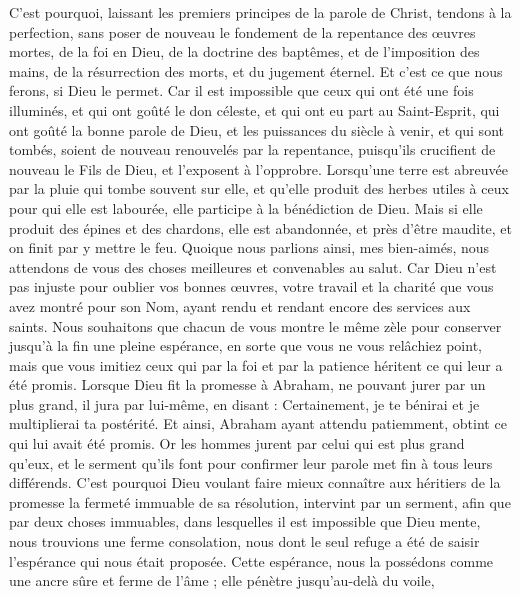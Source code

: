 \begin{multicols}{2}
\VerseOne{}C'est pourquoi, laissant les premiers principes de la parole de Christ, tendons à la perfection, sans poser de nouveau le fondement de la repentance des œuvres mortes,
de la foi en Dieu, de la doctrine des baptêmes, et de l'imposition des mains, de la résurrection des morts, et du jugement éternel.
Et c'est ce que nous ferons, si Dieu le permet.
Car il est impossible que ceux qui ont été une fois illuminés, et qui ont goûté le don céleste, et qui ont eu part au Saint-Esprit,
qui ont goûté la bonne parole de Dieu, et les puissances du siècle à venir,
et qui sont tombés, soient de nouveau renouvelés par la repentance, puisqu’ils crucifient de nouveau le Fils de Dieu, et l'exposent à l'opprobre.
Lorsqu’une terre est abreuvée par la pluie qui tombe souvent sur elle, et qu’elle produit des herbes utiles à ceux pour qui elle est labourée, elle participe à la bénédiction de Dieu.
Mais si elle produit des épines et des chardons, elle est abandonnée, et près d’être maudite, et on finit par y mettre le feu.
Quoique nous parlions ainsi, mes bien-aimés, nous attendons de vous des choses meilleures et convenables au salut.
Car Dieu n'est pas injuste pour oublier vos bonnes œuvres, votre travail et la charité que vous avez montré pour son Nom, ayant rendu et rendant encore des services aux saints.
Nous souhaitons que chacun de vous montre le même zèle pour conserver jusqu'à la fin une pleine espérance,
en sorte que vous ne vous relâchiez point, mais que vous imitiez ceux qui par la foi et par la patience héritent ce qui leur a été promis.
Lorsque Dieu fit la promesse à Abraham, ne pouvant jurer par un plus grand, il jura par lui-même,
en disant : Certainement, je te bénirai et je multiplierai ta postérité.
Et ainsi, Abraham ayant attendu patiemment, obtint ce qui lui avait été promis.
Or les hommes jurent par celui qui est plus grand qu'eux, et le serment qu'ils font pour confirmer leur parole met fin à tous leurs différends.
C'est pourquoi Dieu voulant faire mieux connaître aux héritiers de la promesse la fermeté immuable de sa résolution, intervint par un serment,
afin que par deux choses immuables, dans lesquelles il est impossible que Dieu mente, nous trouvions une ferme consolation, nous dont le seul refuge a été de saisir l'espérance qui nous était proposée.
Cette espérance, nous la possédons comme une ancre sûre et ferme de l'âme ; elle pénètre jusqu'au-delà du voile,

\end{multicols}
